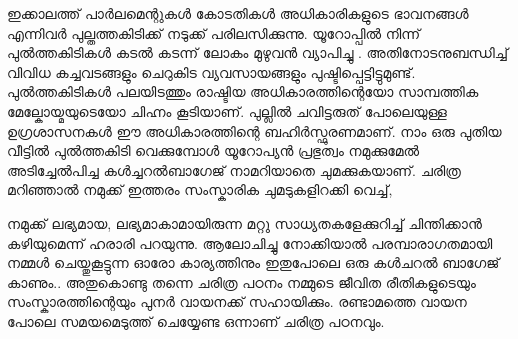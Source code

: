 \documentclass[10pt,a4paper]{report}
\begin{document}
   ഇക്കാലത്ത് പാർലമെന്റുകൾ കോടതികൾ അധികാരികളുടെ ഭാവനങ്ങൾ എന്നിവർ പുല്തത്തകിടിക്ക് നടുക്ക് പരിലസിക്കുന്നു. യൂറോപ്പില്‍ നിന്ന് പുല്‍ത്തകിടികള്‍ കടല്‍ കടന്ന് ലോകം മുഴുവന്‍ വ്യാപിച്ചു . അതിനോടനുബന്ധിച്ച് വിവിധ കച്ചവടങ്ങളും ചെറുകിട വ്യവസായങ്ങളും പുഷ്ടിപ്പെട്ടിട്ടുമുണ്ട്. പുല്‍ത്തകിടികൾ പലയിടത്തും രാഷ്ടിയ അധികാരത്തിന്റെയോ സാമ്പത്തിക മേല്കോയ്മയുടെയോ ചിഹ്നം കൂടിയാണ്. പുല്ലിൽ ചവിട്ടരുത് പോലെയുള്ള ഉഗ്രശാസനകൾ ഈ അധികാരത്തിന്റെ ബഹിർസ്ഫുരണമാണ്. നാം ഒരു പുതിയ വീട്ടിൽ പുല്‍ത്തകിടി വെക്കുമ്പോള്‍ യൂറോപ്യന്‍ പ്രഭുത്വം നമുക്കുമേല്‍ അടിച്ചേല്‍പിച്ച കള്‍ച്ചറല്‍ബാഗേജ് നാമറിയാതെ ചുമക്കുകയാണ്. ചരിത്ര മറിഞ്ഞാല്‍ നമുക്ക് ഇത്തരം സംസ്കാരിക ചുമടുകളിറക്കി വെച്ച്,
   
    നമുക്ക് ലഭ്യമായ, ലഭ്യമാകാമായിരുന്ന മറ്റു സാധ്യതകളേക്കുറിച്ച് ചിന്തിക്കാന്‍ കഴിയുമെന്ന് ഹരാരി പറയുന്നു. ആലോചിച്ചു നോക്കിയാല്‍ പരമ്പാരാഗതമായി നമ്മള്‍ ചെയ്തുകൂട്ടുന്ന ഓരോ കാര്യത്തിനും ഇതുപോലെ ഒരു കള്‍ചറല്‍ ബാഗേജ് കാണും.. അതുകൊണ്ടു തന്നെ ചരിത്ര പഠനം നമ്മുടെ ജീവിത രീതികളുടെയും സംസ്കാരത്തിന്റെയും പുനർ വായനക്ക് സഹായിക്കും. രണ്ടാമത്തെ വായന പോലെ സമയമെടുത്ത് ചെയ്യേണ്ട ഒന്നാണ് ചരിത്ര പഠനവും.   
    
\end{document}
